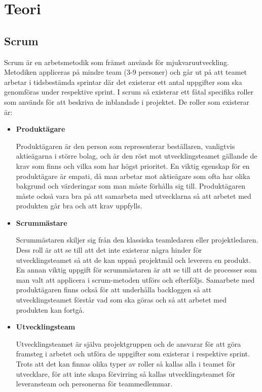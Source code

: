 \chapter{Teori}

\section{Scrum}
Scrum är en arbetsmetodik som främst används för mjukvaruutveckling. Metodiken appliceras på mindre team (3-9 personer) och går ut på att teamet arbetar i tidsbestämda sprintar där det existerar ett antal uppgifter som ska genomföras under respektive sprint.
I scrum så existerar ett fåtal specifika roller som används för att beskriva de inblandade i projektet. De roller som existerar är:

\begin{itemize}
	\item \textbf{Produktägare}
	
	Produktägaren är den person som representerar beställaren, vanligtvis aktieägarna i större bolag, och är den röst mot utvecklingsteamet gällande de krav som finns och vilka som har högst prioritet. En viktig egenskap för en produktägare är empati, då man arbetar mot aktieägare som ofta har olika bakgrund och värderingar som man måste förhålla sig till. Produktägaren måste också vara bra på att samarbeta med utvecklarna så att arbetet med produkten går bra och att krav uppfylls.
	
	\item \textbf{Scrummästare}
	
	Scrummästaren skiljer sig från den klassiska teamledaren eller projektledaren. Dess roll är att se till att det inte existerar några hinder för utvecklingsteamet så att de kan uppnå projektmål och leverera en produkt. En annan viktig uppgift för scrummästaren är att se till att de processer som man valt att applicera i scrum-metoden utförs och efterföljs. Samarbete med produktägaren finns också för att underhålla backloggen så att utvecklingsteamet förstår vad som ska göras och så att arbetet med produkten kan fortgå.
	
	\item \textbf{Utvecklingsteam}
	
	Utvecklingsteamet är själva projektgruppen och de ansvarar för att göra framsteg i arbetet och utföra de uppgifter som existerar i respektive sprint. Trots att det kan finnas olika typer av roller så kallas alla i teamet för utvecklare, för att inte skapa förvirring så kallas utvecklingsteamet för leveransteam och personerna för teammedlemmar.	
\end{itemize}

